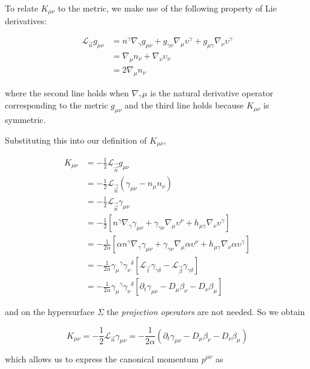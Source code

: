 To relate $K_{\mu\nu}$ to the metric, we make use of the following property of Lie derivatives:

\begin{align}
\mathcal{L}_{\vec{n}}g_{\mu\nu} &= n^{\gamma}\nabla_{\gamma}g_{\mu\nu} + g_{\gamma\nu}\nabla_{\mu}\upsilon^{\gamma} + g_{\mu\gamma}\nabla_{\nu}\upsilon^{\gamma} \\
&= \nabla_{\mu}n_{\nu}+\nabla_{\nu}\upsilon_{\nu} \\
&=2\nabla_{\mu}n_{\nu}
\end{align}

where the second line holds when $\nabla_{\gamma}\mu$ is the natural derivative operator corresponding to the metric $g_{\mu\nu}$ and the third line holds because $K_{\mu\nu}$ is symmetric.

Substituting this into our definition of $K_{\mu\nu}$,

\begin{align}
K_{\mu\nu} &= -\frac{1}{2}\mathcal{L}_{\vec{\vec{n}}}g_{\mu\nu} \\
&= -\frac{1}{2}\mathcal{L}_{\vec{\vec{n}}}(\gamma_{\mu\nu}-n_{\mu}n_{\nu}) \\
&= -\frac{1}{2}\mathcal{L}_{\vec{\vec{n}}}\gamma_{\mu\nu} \\
&= -\frac{1}{2}[n^{\gamma}\nabla_{\gamma}\gamma_{\mu\nu} + \gamma_{\gamma\nu}\nabla_{\mu}\upsilon^{\nu} + h_{\mu\gamma}\nabla_{\nu}\upsilon^{\gamma}] \\
&= -\frac{1}{2\alpha}[\alpha n^{\gamma}\nabla_{\gamma}\gamma_{\mu\nu} + \gamma_{\gamma\nu}\nabla_{\mu}\alpha\upsilon^{\nu} + h_{\mu\gamma}\nabla_{\nu}\alpha\upsilon^{\gamma}] \\
&= -\frac{1}{2\alpha}{\gamma_{\mu}}^{\gamma}{\gamma_{\nu}}^{\delta}[\mathcal{L}_{\vec{t}}\gamma_{\gamma\delta}-\mathcal{L}_{\vec{\beta}}\gamma_{\gamma\delta}] \\
&= -\frac{1}{2\alpha}{\gamma_{\mu}}^{\gamma}{\gamma_{\nu}}^{\delta}[\partial_t\gamma_{\mu\nu}-D_{\mu}\beta_{\nu}-D_{\nu}\beta_{\mu}]
\end{align}

and on the hypersurface $\Sigma$ the \textit{projection operators} are not needed. So we obtain

\begin{equation}
K_{\mu\nu} = -\frac{1}{2}\mathcal{L}_{\vec{n}}\gamma_{\mu\nu}=-\frac{1}{2\alpha}(\partial_t\gamma_{\mu\nu}-D_{\mu}\beta_{\nu}-D_{\nu}\beta_{\mu})
\end{equation}

which allows us to express the canonical momentum $p^{\mu\nu}$ as

